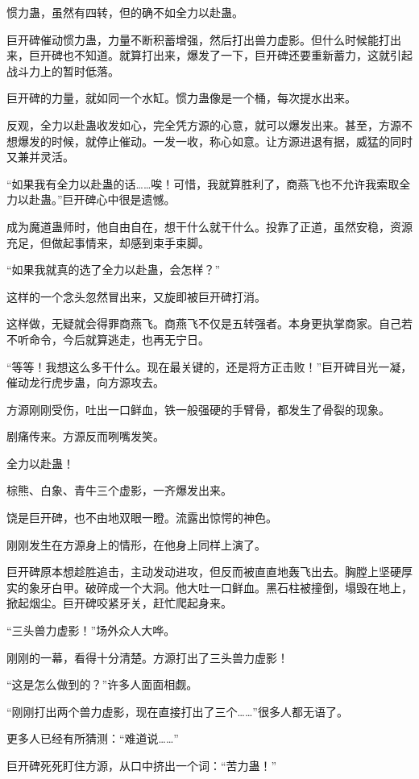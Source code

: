 \begin{this_body}
惯力蛊，虽然有四转，但的确不如全力以赴蛊。

巨开碑催动惯力蛊，力量不断积蓄增强，然后打出兽力虚影。但什么时候能打出来，巨开碑也不知道。就算打出来，爆发了一下，巨开碑还要重新蓄力，这就引起战斗力上的暂时低落。

巨开碑的力量，就如同一个水缸。惯力蛊像是一个桶，每次提水出来。

反观，全力以赴蛊收发如心，完全凭方源的心意，就可以爆发出来。甚至，方源不想爆发的时候，就停止催动。一发一收，称心如意。让方源进退有据，威猛的同时又兼并灵活。

“如果我有全力以赴蛊的话……唉！可惜，我就算胜利了，商燕飞也不允许我索取全力以赴蛊。”巨开碑心中很是遗憾。

成为魔道蛊师时，他自由自在，想干什么就干什么。投靠了正道，虽然安稳，资源充足，但做起事情来，却感到束手束脚。

“如果我就真的选了全力以赴蛊，会怎样？”

这样的一个念头忽然冒出来，又旋即被巨开碑打消。

这样做，无疑就会得罪商燕飞。商燕飞不仅是五转强者。本身更执掌商家。自己若不听命令，今后就算逃走，也再无宁日。

“等等！我想这么多干什么。现在最关键的，还是将方正击败！”巨开碑目光一凝，催动龙行虎步蛊，向方源攻去。

方源刚刚受伤，吐出一口鲜血，铁一般强硬的手臂骨，都发生了骨裂的现象。

剧痛传来。方源反而咧嘴发笑。

全力以赴蛊！

棕熊、白象、青牛三个虚影，一齐爆发出来。

饶是巨开碑，也不由地双眼一瞪。流露出惊愕的神色。

刚刚发生在方源身上的情形，在他身上同样上演了。

巨开碑原本想趁胜追击，主动发动进攻，但反而被直直地轰飞出去。胸膛上坚硬厚实的象牙白甲。破碎成一个大洞。他大吐一口鲜血。黑石柱被撞倒，塌毁在地上，掀起烟尘。巨开碑咬紧牙关，赶忙爬起身来。

“三头兽力虚影！”场外众人大哗。

刚刚的一幕，看得十分清楚。方源打出了三头兽力虚影！

“这是怎么做到的？”许多人面面相觑。

“刚刚打出两个兽力虚影，现在直接打出了三个……”很多人都无语了。

更多人已经有所猜测：“难道说……”

巨开碑死死盯住方源，从口中挤出一个词：“苦力蛊！”


\end{this_body}
